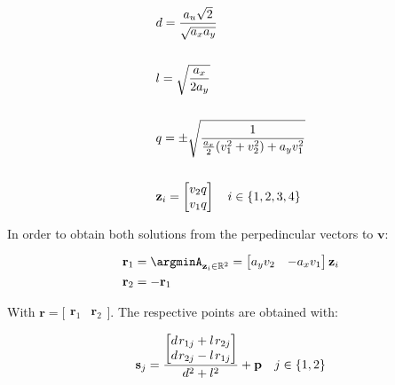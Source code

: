 \begin{align}
    &d = \frac{a_u\sqrt{2}}{\sqrt{a_xa_y}} \label{eq:Constraint_Tangent_Point_auxElement1} \\
    \notag \\
    &l = \sqrt{\frac{a_x}{2a_y}} \label{eq:Constraint_Tangent_Point_auxElement2} \\
    \notag \\
    &q = \pm\sqrt{\frac{1}{\frac{a_x}{2}(v_1^2 + v_2^2) + a_yv_1^2}}  \label{eq:Constraint_Tangent_Point_auxAuxElement} \\
    \notag \\
    &\mathbf{z}_i = \begin{bmatrix}  v_2 q \\ v_1 q \end{bmatrix} \quad i \in \{1,2,3,4\} \label{eq:Constraint_Tangent_Point_auxVector} 
\end{align}

In order to obtain both solutions from the perpedincular vectors to \(\mathbf{v}\):

\begin{subequations}
    \begin{align}
        &\mathbf{r}_1 = \argminA_{\mathbf{z}_i \in \mathbb{R}^2} = \begin{bmatrix} a_yv_2 & - a_xv_1 \end{bmatrix} \mathbf{z}_{i} \label{eq:Constraint_Tangent_Point_bc_per} \\
        &\mathbf{r}_2 = -\mathbf{r}_1 \label{eq:Constraint_Tangent_Point_bc_perp_inverse}
    \end{align}
    \label{eq:Constraint_Tangent_Point_bc}
\end{subequations}   

    

With \(\mathbf{r} = \bigl[\begin{smallmatrix} \mathbf{r}_1&\mathbf{r}_2\end{smallmatrix} \bigr]\). The respective points are obtained with:

\begin{equation}
    \mathbf{s}_j = \frac{\begin{bmatrix} d \hspace{0.1em}r_{1j} + l \hspace{0.1em}r_{2j} \\ d \hspace{0.1em} r_{2j} - l \hspace{0.1em} r_{1j}\end{bmatrix}}{d^2 + l^2} + \mathbf{p} \quad j\in \{1,2\}
    \label{eq:Constraint_Tangent_Points}
\end{equation}

